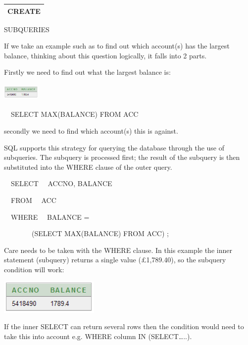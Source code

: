 \begin{flushleft}
\tablefirsthead{}
\tablehead{}
\tabletail{}
\tablelasttail{}
\begin{supertabular}{|m{14.583cm}|}
\hline
CREATE

\\\hline
\end{supertabular}
\end{flushleft}
SUBQUERIES

If we take an example such as to find out which account(s) has the largest balance, thinking about this question logically, it falls into 2 parts.  

Firstly we need to find out what the largest balance is:



\begin{center}
  
\includegraphics[width=1.819cm,height=0.871cm]{images/img (51).png}

\end{center}
\ \ SELECT MAX(BALANCE) FROM ACC

secondly we need to find which account(s) this is against.

SQL supports this strategy for querying the database through the use of subqueries.  The subquery is processed first; the result of the subquery is then substituted into the WHERE clause of the outer query.

\ \ SELECT \ \ ACCNO, BALANCE

\ \ FROM \ \ ACC

\ \ WHERE \ \ BALANCE = 

\ \ \ \ \ \ \ \ (SELECT MAX(BALANCE) FROM ACC) ;

Care needs to be taken with the WHERE clause.  In this example the inner statement (subquery) returns a single value (£1,789.40), so the subquery condition will work:



\begin{center}
  
\includegraphics[width=4.819cm,height=1.669cm]{images/img (51).png}

\end{center}
If the inner SELECT can return several rows then the condition would need to take this into account e.g. WHERE column IN (SELECT{\dots}..).

